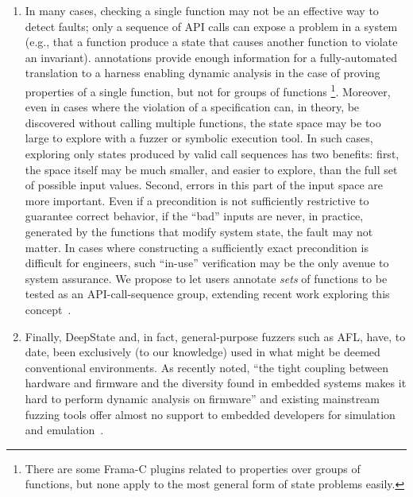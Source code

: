 \begin{enumerate}[labelsep=3pt,leftmargin=12pt]
\item In many cases, checking a single function may not be an effective way to detect faults; only a sequence of API calls can expose a problem in a system (e.g., that a function produce a state that causes another function to violate an invariant).  \acsl annotations provide enough information for a fully-automated translation to a harness enabling dynamic analysis in the case of proving properties of a single function, but not for groups of functions \footnote{There are some Frama-C plugins related to properties over groups of functions, but none apply to the most general form of state problems easily.}.  Moreover, even in cases where the violation of a specification can, in theory, be discovered without calling multiple functions, the state space may be too large to explore with a fuzzer or symbolic execution tool.  In such cases, exploring only states produced by valid call sequences has two benefits:  first, the space itself may be much smaller, and easier to explore, than the full set of possible input values.  Second, errors in this part of the input space are more important.  Even if a precondition is not sufficiently restrictive to guarantee correct behavior, if the ``bad'' inputs are never, in practice, generated by the functions that modify system state, the fault may not matter.  In cases where constructing a sufficiently exact precondition is difficult for engineers, such ``in-use'' verification may be the only avenue to system assurance.  We propose to let users annotate \emph{sets} of functions to be tested as an API-call-sequence group, extending recent work exploring this concept~\cite{blatter2018static,MetAcsl}.  
  \item Finally, DeepState and, in fact, general-purpose fuzzers such as AFL, have, to date, been exclusively (to our knowledge) used in what might be deemed conventional environments.  As recently noted, ``the tight coupling between hardware and firmware and the diversity found in embedded systems makes it hard to perform dynamic analysis on firmware'' and existing mainstream fuzzing tools offer almost no support to embedded developers for simulation and emulation~\cite{halucinator}.
\end{enumerate}

